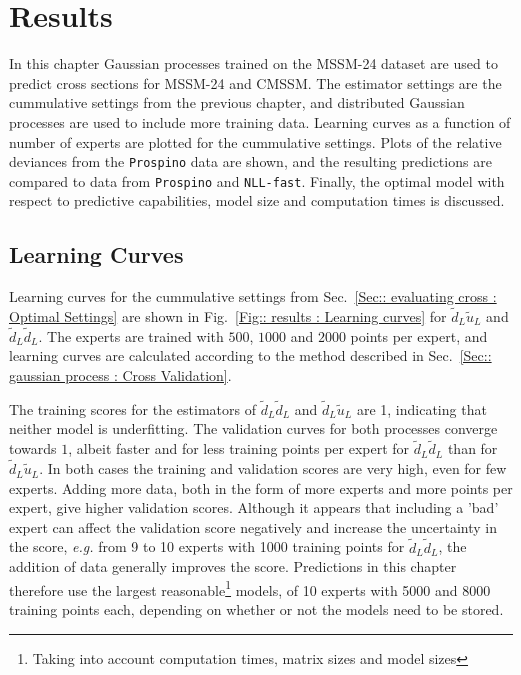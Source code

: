 \documentclass[twoside,english]{uiofysmaster}
\begin{document}
\tableofcontents

\chapter{Results}

In this chapter Gaussian processes trained on the MSSM-24 dataset are used to predict cross sections for MSSM-24 and CMSSM. The estimator settings are the cummulative settings from the previous chapter, and distributed Gaussian processes are used to include more training data. Learning curves as a function of number of experts are plotted for the cummulative settings. Plots of the relative deviances from the \verb|Prospino| data are shown, and the resulting predictions are compared to data from \verb|Prospino| and \verb|NLL-fast|. Finally, the optimal model with respect to predictive capabilities, model size and computation times is discussed.

\section{Learning Curves}

Learning curves for the cummulative settings from Sec.~\ref{Sec:: evaluating cross : Optimal Settings} are shown in Fig.~\ref{Fig:: results : Learning curves} for $\widetilde{d}_L \widetilde{u}_L$ and $\widetilde{d}_L \widetilde{d}_L$. The experts are trained with $500$, $1000$ and $2000$ points per expert, and learning curves are calculated according to the method described in Sec.~\ref{Sec:: gaussian process : Cross Validation}.

The training scores for the estimators of $\widetilde{d}_L \widetilde{d}_L$ and $\widetilde{d}_L \widetilde{u}_L$ are 1, indicating that neither model is underfitting. The validation curves for both processes converge towards $1$, albeit faster and for less training points per expert for $\widetilde{d}_L \widetilde{d}_L$ than for $\widetilde{d}_L \widetilde{u}_L$. In both cases the training and validation scores are very high, even for few experts. Adding more data, both in the form of more experts and more points per expert, give higher validation scores. Although it appears that including a 'bad' expert can affect the validation score negatively and increase the uncertainty in the score, \textit{e.g.} from 9 to 10 experts with 1000 training points for $\widetilde{d}_L \widetilde{d}_L$, the addition of data generally improves the score. Predictions in this chapter therefore use the largest reasonable\footnote{Taking into account computation times, matrix sizes and model sizes} models, of 10 experts with 5000 and 8000 training points each, depending on whether or not the models need to be stored.
\end{document}

